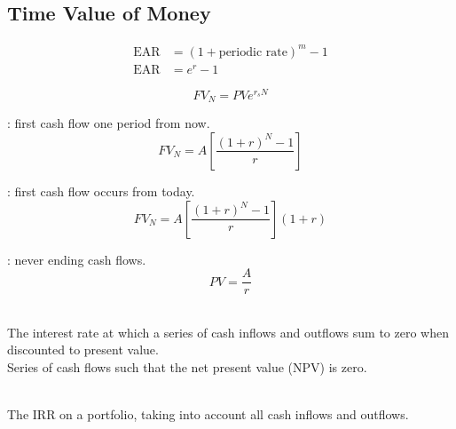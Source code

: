 \subsection{Time Value of Money}

\begin{definition}
\begin{align}
\text{EAR} &= (1 + \text{periodic rate})^m - 1 \nonumber \\
\text{EAR} &= e^r - 1 \nonumber
\end{align}
\end{definition}

\begin{definition}
\begin{equation}
FV_N = PV e^{r_s N} \nonumber
\end{equation}
\end{definition}

\begin{definition}
: first cash flow one period from now.
\begin{equation}
FV_N = A \left[ \frac{(1+r)^N - 1}{r} \right] \nonumber
\end{equation}
\end{definition}

\begin{definition}
: first cash flow occurs from today.
\begin{equation}
FV_N = A \left[ \frac{(1+r)^N - 1}{r} \right] (1+r) \nonumber
\end{equation}
\end{definition}

\begin{definition}
: never ending cash flows.
\begin{equation}
PV = \frac{A}{r} \nonumber
\end{equation}
\end{definition}

\begin{definition} \\
The interest rate at which a series of cash inflows and outflows sum to zero when discounted to present value.\\
Series of cash flows such that the net present value (NPV) is zero.
\end{definition}

\begin{definition} \\
The IRR on a portfolio, taking into account all cash inflows and outflows.
\end{definition}

